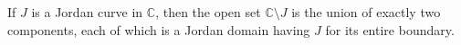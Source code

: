 If $J$ is a Jordan curve in $\mathbb{C}$, then the open set $\mathbb{C} \setminus J$ is the union of exactly two components, each of which is a Jordan domain having $J$ for its entire boundary.
